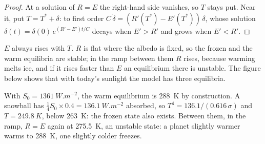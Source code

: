 \begin{proof}
At a solution of $R = E$ the right-hand side vanishes, so $T$ stays put. Near it, put $T = T^*
+ \delta$: to first order $C\,\dot\delta = (R'(T^*) - E'(T^*))\,\delta$, whose solution
$\delta(t) = \delta(0)\,e^{(R' - E')t/C}$ decays when $E' > R'$ and grows when $E' < R'$.
\end{proof}

$E$ always rises with $T$. $R$ is flat where the albedo is fixed, so the frozen and the warm
equilibria are stable; in the ramp between them $R$ rises, because warming melts ice, and if it
rises faster than $E$ an equilibrium there is unstable. The figure below shows that with today's
sunlight the model has three equilibria.

\begin{example}\label{ex:b2:precambrian-earth:three}
With $S_0 = \qty{1361}{W.m^{-2}}$, the warm equilibrium is \qty{288}{K} by construction. A
snowball has $\tfrac14 S_0\times0.4 = \qty{136.1}{W.m^{-2}}$ absorbed, so $T^4 =
136.1/(0.616\,\sigma)$ and $T = \qty{249.8}{K}$, below \qty{263}{K}: the frozen state also
exists. Between them, in the ramp, $R = E$ again at \qty{275.5}{K}, an unstable state: a
planet slightly warmer warms to \qty{288}{K}, one slightly colder freezes.
\end{example}

